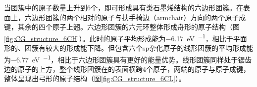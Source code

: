     当团簇中的原子数量上升到6个，即可形成具有类石墨烯结构的六边形团簇。在表面上，六边形团簇的两个相对的原子与扶手椅边（armchair）方向的两个原子成键，其余的四个原子上翘。六边形团簇的六元环整体形成舟形的原子结构（图\ref{fig:CG_structure_6CH}）。此时的原子平均形成能为\SI{-6.17}{\electronvolt\per\atom}，相比于平面形的、团簇有较大的形成能下降。但包含六个sp杂化原子的线形团簇的平均形成能为\SI{-6.77}{\electronvolt\per\atom}，相比于六边形团簇具有更好的能量优势。线形团簇同样处于锯齿边的原子的上方，整个线形团簇在的表面横跨4个原子，两端的原子与原子成键，整体呈现出弓形的原子结构（图\ref{fig:CG_structure_6CL}）。

    \begin{figure}[htb]
        \\[-1ex]
\end{figure}
